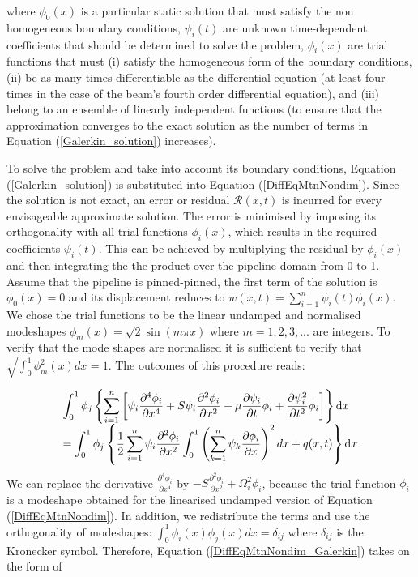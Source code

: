 \documentclass[3p,doublespacing,authoryear,11pt]{elsarticle} %
\begin{document}
where $\phi_0(x)$ is a particular static solution that must satisfy the non homogeneous boundary conditions, $\psi_i(t)$ are unknown time-dependent coefficients that should be determined to solve the problem, $\phi_i(x)$ are trial functions that must (i) satisfy the homogeneous form of the boundary conditions, (ii) be as many times differentiable as the differential equation (at least four times in the case of the beam's fourth order differential equation), and (iii) belong to an ensemble of linearly independent functions (to ensure that the approximation converges to the exact solution as the number of terms in Equation (\ref{Galerkin_solution}) increases). 

To solve the problem and take into account its boundary conditions, Equation (\ref{Galerkin_solution}) is substituted into Equation (\ref{DiffEqMtnNondim}). Since the solution is not exact, an error or residual $\mathcal{R}(x,t)$ is incurred for every envisageable approximate solution. The error is minimised by imposing its orthogonality with all trial functions $\phi_i(x)$, which results in the required coefficients $\psi_i(t)$. This can be achieved by multiplying the residual by $\phi_i(x)$ and then integrating the the product over the pipeline domain from 0 to 1. Assume that the pipeline is pinned-pinned, the first term of the solution is $\phi_0(x)=0$ and its displacement reduces to $w(x,t) = \sum_{i=1}^n \psi_i(t) \phi_i(x)$. We chose the trial functions to be the linear undamped and normalised modeshapes $\phi_m(x) = \sqrt{2}\sin (m \pi x)$ where $m=1,2,3,...$ are integers. To verify that the mode shapes are normalised it is sufficient to verify that $\displaystyle\sqrt{\int_0^1 \phi_m^2(x) dx} = 1$. The outcomes of this procedure reads:
  
 \begin{equation}\label{DiffEqMtnNondim_Galerkin}
 \begin{array}{l } 
\displaystyle \int_0^1 \phi_j \left \{  \sum_{i=1}^n \left[ \psi_i \frac{\partial^4 \phi_i}{\partial x^4} +  S \psi_i  \frac{\partial^2 \phi_i}{\partial x^2} + \mu \frac{\partial {\psi}_i}{\partial t}  \phi_i + \frac{\partial {\psi}_i^2}{\partial t^2}  \phi_i  \right] \right \} \textup{d} x  \\
\displaystyle =  \int_0^1 \phi_j \left \{\frac{1}{2}  \sum_{i=1}^n  \psi_i  \frac{\partial^2 \phi_i}{\partial x^2} \int_0^1 \left(   \sum_{k=1}^n  \psi_k \frac{\partial \phi_i}{\partial x} \right)^2 dx+ q (x,t)  \right \} \textup{d} x
  \end{array}  
\end{equation}
We can replace the derivative $\frac{\partial^4 \phi_i}{\partial x^4}$ by $-S \frac{\partial^2 \phi_i}{\partial x^2} + \Omega_i^2 \phi_i$, because the trial function $\phi_i$ is a modeshape obtained for the linearised undamped version of Equation (\ref{DiffEqMtnNondim}). In addition, we redistribute the terms and use the orthogonality of modeshapes: $\displaystyle \int_0^1 \phi_i(x) \phi_j (x) dx =\delta_{ij}$ where $\delta_{ij}$ is the Kronecker symbol. Therefore, Equation (\ref{DiffEqMtnNondim_Galerkin}) takes on the form of
\end{document}
